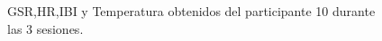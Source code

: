 \begin{figure}[h]
        \centering
        \caption{GSR,HR,IBI y Temperatura obtenidos del participante 10 durante las 3 sesiones.}\label{fig:data_p10}
\end{figure}
\pagebreak
